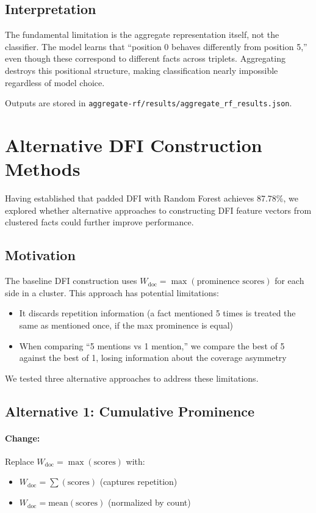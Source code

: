 \documentclass[12pt,a4paper]{article}
\begin{document}
\subsection{Interpretation}

The fundamental limitation is the aggregate representation itself, not the classifier.
The model learns that ``position 0 behaves differently from position 5,'' even though these
correspond to different facts across triplets. Aggregating destroys this positional structure,
making classification nearly impossible regardless of model choice.

Outputs are stored in \texttt{aggregate-rf/results/aggregate\_rf\_results.json}.

\section{Alternative DFI Construction Methods}

Having established that padded DFI with Random Forest achieves 87.78\%, we explored whether
alternative approaches to constructing DFI feature vectors from clustered facts could
further improve performance.

\subsection{Motivation}

The baseline DFI construction uses $W_{\text{doc}} = \max(\text{prominence scores})$ for each
side in a cluster. This approach has potential limitations:
\begin{itemize}
\item It discards repetition information (a fact mentioned 5 times is treated the same as
      mentioned once, if the max prominence is equal)
\item When comparing ``5 mentions vs 1 mention,'' we compare the best of 5 against the best of 1,
      losing information about the coverage asymmetry
\end{itemize}

We tested three alternative approaches to address these limitations.

\subsection{Alternative 1: Cumulative Prominence}

\paragraph{Change:} Replace $W_{\text{doc}} = \max(\text{scores})$ with:
\begin{itemize}
\item $W_{\text{doc}} = \sum(\text{scores})$ (captures repetition)
\item $W_{\text{doc}} = \text{mean}(\text{scores})$ (normalized by count)
\end{itemize}
\end{document}
